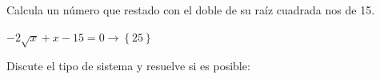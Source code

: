 \documentclass[addpoints,spanish, 12pt,a4paper]{exam}
\begin{document}
\begin{questions}

\question[1] Calcula un número que restado con el doble de su raíz cuadrada nos de 15.
\addpoints %
\begin{solution}
 	$- 2 \sqrt{x} + x - 15 = 0\to \left\{25\right\}$ 
\end{solution}

        \question Discute el tipo de sistema y resuelve si es posible:


\end{questions}
\end{document}
